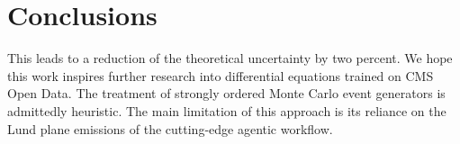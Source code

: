 \section{Conclusions}\label{sec:conclusions}

This leads to a reduction of the theoretical uncertainty by two percent.
We hope this work inspires further research into differential equations
trained on CMS Open Data. The treatment of strongly ordered Monte Carlo
event generators is admittedly heuristic. The main limitation of this
approach is its reliance on the Lund plane emissions of the cutting-edge
agentic workflow.

